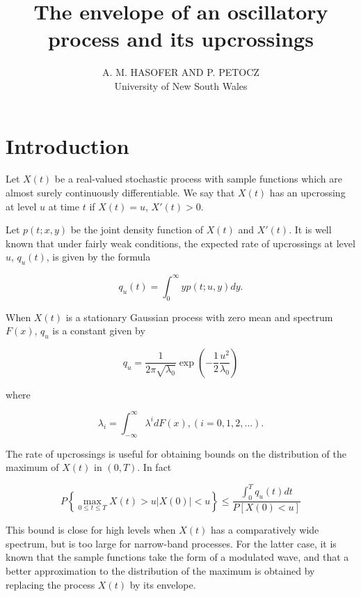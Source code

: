 \documentclass{article}
\title{The envelope of an oscillatory process and its upcrossings}
\author{A. M. HASOFER AND P. PETOCZ\\ University of New South Wales}
\date{}
\begin{document}
\maketitle

\section{Introduction}
Let $X(t)$ be a real-valued stochastic process with sample functions which are almost surely continuously differentiable. We say that $X(t)$ has an upcrossing at level $u$ at time $t$ if $X(t) = u$, $X'(t)>0$.

Let $p(t; x, y)$ be the joint density function of $X(t)$ and $X'(t)$. It is well known that under fairly weak conditions, the expected rate of upcrossings at level $u$, $q_u(t)$, is given by the formula

\begin{equation}
\label{eq:expected_rate}
q_u(t) = \int_0^{\infty} yp(t; u, y) dy.
\end{equation}

When $X(t)$ is a stationary Gaussian process with zero mean and spectrum $F(x)$, $q_u$ is a constant given by

\begin{equation}
\label{eq:stationary_gaussian}
q_u = \frac{1}{2\pi\sqrt{\lambda_0}} \exp \left(-\frac{1}{2} \frac{u^2}{\lambda_0}\right)
\end{equation}

where

\begin{equation}
\label{eq:lambda_i}
\lambda_i = \int_{-\infty}^{\infty} \lambda^i dF(x), (i = 0, 1, 2, \ldots).
\end{equation}

The rate of upcrossings is useful for obtaining bounds on the distribution of the maximum of $X(t)$ in $(0, T)$. In fact

\begin{equation}
\label{eq:probability_bound}
P\left\{ \max_{0\leq t\leq T} X(t)>u|X(0)|<u\right\}\leq \frac{\int_0^T q_u(t) dt}{P[X(0)<u]}
\end{equation}

This bound is close for high levels when $X(t)$ has a comparatively wide spectrum, but is too large for narrow-band processes. For the latter case, it is known that the sample functions take the form of a modulated wave, and that a better approximation to the distribution of the maximum is obtained by replacing the process $X(t)$ by its envelope.
\end{document}
